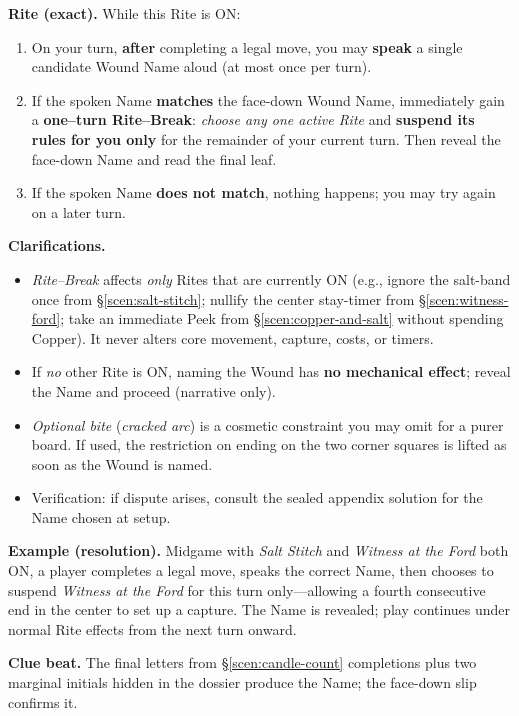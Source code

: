 \documentclass[11pt]{article}
\begin{document}
\medskip
\noindent\textbf{Rite (exact).} While this Rite is \textsc{ON}:
\begin{enumerate}\setlength\itemsep{0.2em}
  \item On your turn, \textbf{after} completing a legal move, you may \textbf{speak} a single candidate Wound Name aloud (at most once per turn).
  \item If the spoken Name \textbf{matches} the face-down Wound Name, immediately gain a \textbf{one–turn Rite–Break}: \emph{choose any one active Rite} and \textbf{suspend its rules for you only} for the remainder of your current turn. Then reveal the face-down Name and read the final leaf.
  \item If the spoken Name \textbf{does not match}, nothing happens; you may try again on a later turn.
\end{enumerate}

\medskip
\noindent\textbf{Clarifications.}
\begin{itemize}\setlength\itemsep{0.25em}
  \item \textit{Rite–Break} affects \emph{only} Rites that are currently \textsc{ON} (e.g., ignore the salt-band once from \S\ref{scen:salt-stitch}; nullify the center stay-timer from \S\ref{scen:witness-ford}; take an immediate Peek from \S\ref{scen:copper-and-salt} without spending Copper). It never alters core movement, capture, costs, or timers.
  \item If \emph{no} other Rite is \textsc{ON}, naming the Wound has \textbf{no mechanical effect}; reveal the Name and proceed (narrative only).
  \item \textit{Optional bite} (\emph{cracked arc}) is a cosmetic constraint you may omit for a purer board. If used, the restriction on ending on the two corner squares is lifted as soon as the Wound is named.
  \item Verification: if dispute arises, consult the sealed appendix solution for the Name chosen at setup.
\end{itemize}

\medskip
\noindent\textbf{Example (resolution).}  
Midgame with \emph{Salt Stitch} and \emph{Witness at the Ford} both \textsc{ON}, a player completes a legal move, speaks the correct Name, then chooses to suspend \emph{Witness at the Ford} for this turn only—allowing a fourth consecutive end in the center to set up a capture. The Name is revealed; play continues under normal Rite effects from the next turn onward.

\medskip
\noindent\textbf{Clue beat.} The final letters from \S\ref{scen:candle-count} completions plus two marginal initials hidden in the dossier produce the Name; the face-down slip confirms it.
\end{document}
